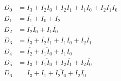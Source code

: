 \[
	\begin{aligned}
		D_0 & = I_3 + \overline{I_2 I_0} + \overline{I_2} I_1 + I_1 \overline{I_0} + I_2 \overline{I_1} I_0 \\
		D_1 & = \overline{I_1} + I_0 + I_2                                                                  \\
		D_2 & = \overline{I_2 I_0} + I_1 \overline{I_0}                                                     \\
		D_3 & = I_3 + \overline{I_2} I_1 + I_1 \overline{I_0} + I_2 \overline{I_1}                          \\
		D_4 & = \overline{I_2} + \overline{I_1 I_0} + I_1 I_0                                               \\
		D_5 & = I_3 + \overline{I_1 I_0} + I_2 \overline{I_1} + I_2 \overline{I_0}                          \\
		D_6 & = I_3 + I_1 + \overline{I_2 I_0} + I_2 I_0
	\end{aligned}
\]















